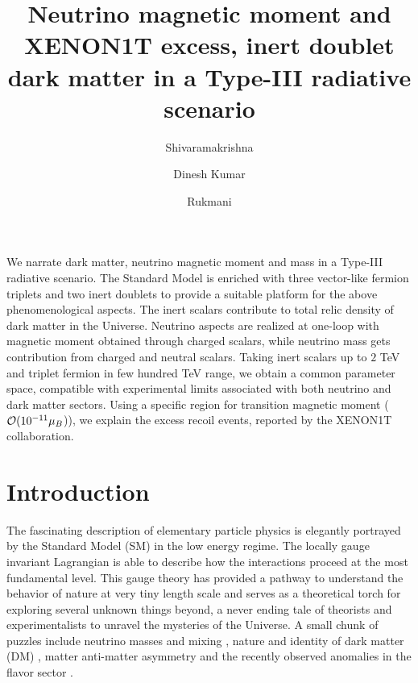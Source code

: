 \documentclass[aps, a4paper,superscriptaddress,12pt,preprintnumbers,floatfix,nofootinbib,amsmath,amssymb]{revtex4}
\begin{document}
\title{\hspace*{-1.0cm} Neutrino magnetic moment and XENON1T excess, inert doublet dark matter in a Type-III radiative scenario} 
\author{Shivaramakrishna }
\author{Dinesh Kumar }
\author{Rukmani }

\begin{abstract}
\vspace*{1cm}

  
\end{abstract}
\maketitle
We narrate dark matter, neutrino magnetic moment and mass in a Type-III radiative scenario. The Standard Model is enriched with three vector-like fermion triplets and two inert doublets to provide a suitable platform for the above phenomenological aspects.  The inert scalars contribute to total relic density of dark matter in the Universe. Neutrino aspects are realized at one-loop with magnetic moment obtained through charged scalars, while neutrino mass gets contribution from charged and neutral scalars. Taking inert scalars up to $2$ TeV and triplet fermion in few hundred TeV range, we obtain a common parameter space, compatible with experimental limits associated with both neutrino and dark matter sectors. Using a specific region for transition magnetic moment (${\cal O} (10^{-11}\mu_B$)), we explain the excess recoil events, reported by the XENON1T collaboration.
\newpage
\section{Introduction}
The fascinating description of elementary particle physics is elegantly portrayed by the Standard Model (SM) in the low energy regime. The locally gauge invariant Lagrangian is able to describe how the interactions proceed at the most fundamental level.  This gauge theory has provided a pathway to understand the behavior of nature at very tiny length scale and serves as a theoretical torch for exploring  several unknown things beyond, a never ending tale of theorists and experimentalists to unravel the mysteries of the Universe. A small chunk of puzzles include neutrino masses and mixing \cite{Bilenky:1999ge,Mohapatra:1979ia,Schechter:1980gr,Babu:1992ia,Super-Kamiokande:2005wtt,SNO:2002tuh,Super-Kamiokande:2016yck,T2K:2019efw,DayaBay:2012fng,DoubleChooz:2011ymz}, nature and identity of dark matter (DM) \cite{Zwicky:1937zza,PhysRev.43.147,Bertone:2004pz,Mambrini:2015vna}, matter anti-matter asymmetry \cite{Sakharov:1967dj,Kolb:1979qa,Fukugita:1986hr,Fritzsch:1974nn} and the recently observed  anomalies in the flavor sector \cite{Bifani:2018zmi}.
\end{document}
